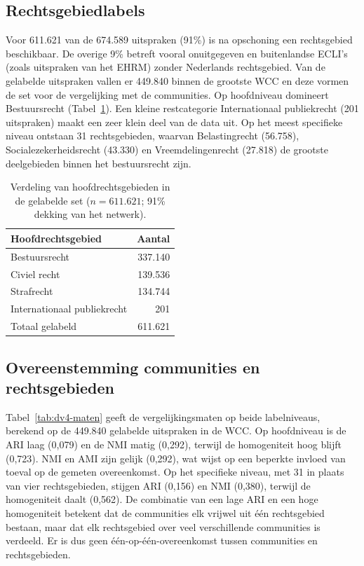 \documentclass[a4paper, 12pt]{report}
\begin{document}
\subsection{Rechtsgebiedlabels} 
Voor 611.621 van de 674.589 uitspraken (91\%) is na opschoning een rechtsgebied beschikbaar. De overige 9\% betreft vooral onuitgegeven en buitenlandse ECLI's (zoals uitspraken van het EHRM) zonder Nederlands rechtsgebied. Van de gelabelde uitspraken vallen er 449.840 binnen de grootste WCC en deze vormen de set voor de vergelijking met de communities. Op hoofdniveau domineert Bestuursrecht (Tabel~\ref{tab:dv4-sample}). Een kleine restcategorie Internationaal publiekrecht (201 uitspraken) maakt een zeer klein deel van de data uit. Op het meest specifieke niveau ontstaan 31 rechtsgebieden, waarvan Belastingrecht (56.758), Socialezekerheidsrecht (43.330) en Vreemdelingenrecht (27.818) de grootste deelgebieden binnen het bestuursrecht zijn.



\begin{table}[H]
  \centering
  \caption{Verdeling van hoofdrechtsgebieden in de gelabelde set ($n = 611.621$; 91\% dekking van het netwerk).}
  \label{tab:dv4-sample}
  \begin{tabular}{lr}
    \toprule
    Hoofdrechtsgebied & Aantal \\
    \midrule
    Bestuursrecht               & 337.140 \\
    Civiel recht                & 139.536 \\
    Strafrecht                  & 134.744 \\
    Internationaal publiekrecht & 201 \\
    \midrule
    Totaal gelabeld             & 611.621 \\
    \bottomrule
  \end{tabular}
\end{table}

\subsection{Overeenstemming communities en rechtsgebieden}
Tabel~\ref{tab:dv4-maten} geeft de vergelijkingsmaten op beide labelniveaus, berekend op de 449.840 gelabelde uitspraken in de WCC. Op hoofdniveau is de ARI laag (0,079) en de NMI matig (0,292), terwijl de homogeniteit hoog blijft (0,723). NMI en AMI zijn gelijk (0,292), wat wijst op een beperkte invloed van toeval op de gemeten overeenkomst. Op het specifieke niveau, met 31 in plaats van vier rechtsgebieden, stijgen ARI (0,156) en NMI (0,380), terwijl de homogeniteit daalt (0,562). De combinatie van een lage ARI en een hoge homogeniteit betekent dat de communities elk vrijwel uit één rechtsgebied bestaan, maar dat elk rechtsgebied over veel verschillende communities is verdeeld. Er is dus geen één-op-één-overeenkomst tussen communities en rechtsgebieden.
\end{document}
